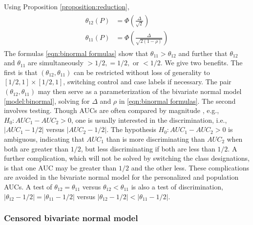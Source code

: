 \documentclass[12pt]{article}
\DeclareMathOperator{\AUC}{AUC}
\newcommand{\cind}{\perp \!\!\! \perp}
\newcommand{\aucindiv}{\theta_{11}}%
\newcommand{\aucpop}{\theta_{12}}%
\newcommand{\comment}[1]{
  \iftoggle{commenttoggle}{
    {\normalsize{\color{red}{ #1}}\normalsize}
  }
  {}
}
\begin{document}
Using Proposition \ref{proposition:reduction},
\begin{gather}
  \begin{aligned}
  \aucpop(P) &= \Phi\left(\frac{\Delta}{\sqrt{2}}\right)\\
  \aucindiv(P) &=  \Phi\left(\frac{\Delta}{\sqrt{2(1-\rho)}}\right)\label{eqn:binormal formulas}
\end{aligned}
\end{gather}
The formulas \eqref{eqn:binormal formulas} show that $\aucindiv>\aucpop$ and further that $\aucpop$ and
$\aucindiv$ are simultaneously $>1/2,=1/2,$ or $<1/2$. We give two benefits. The
first is that $(\aucpop,\aucindiv)$ can be restricted without loss of
generality to $[1/2,1]\times[1/2,1]$, switching control and case labels if necessary. The pair $(\aucpop,\aucindiv)$  may then serve as a
parameterization of the bivariate normal model \eqref{model:binormal}, solving for $\Delta$ and $\rho$ in \eqref{eqn:binormal formulas}.  The
second involves testing. Though AUCs are often compared by magnitude%
, e.g., $H_0:AUC_1-AUC_2>0$, one is
usually interested in the discrimination, i.e., $|AUC_1-1/2|$ versus
$|AUC_2-1/2|$. The hypothesis $H_0:AUC_1-AUC_2>0$ is ambiguous, indicating that
$AUC_1$ than is more discriminating than $AUC_2$ when both are greater than $1/2$, but less
discriminating if both are less than $1/2$.  A further complication, which will not
be solved by switching the class designations, is
that one AUC may be greater than $1/2$ and the other less. These complications are
avoided in the bivariate normal model for the personalized and population
AUCs. A test of $\aucpop=\aucindiv$ versus $\aucpop<\aucindiv$ is also a test of
discrimination, $|\aucpop-1/2|=|\aucindiv-1/2|$ versus $|\aucpop-1/2|<|\aucindiv-1/2|$.

\subsubsection{Censored bivariate normal model}
\end{document}
